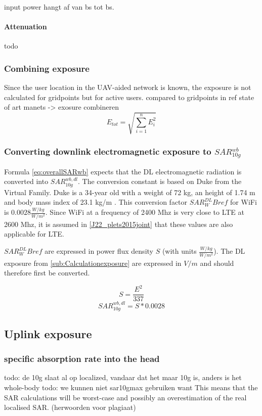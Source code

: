 input power hangt af van bs tot bs.
\paragraph{Attenuation}
todo

\subsubsection{Combining exposure}
\label{sec:combiningexposure}
Since the user location in the UAV-aided network is known, the exposure is not calculated for gridpoints but for active users. compared to gridpoints in ref state of art
manets -> exosure combineren
\begin{equation}
E_{tot} = \sqrt{\sum_{i=1}^{n} E_i^2}
\label{eq:totalexposure}
\end{equation}

\subsubsection{Converting downlink electromagnetic exposure to $SAR^{wb}_{10g}$}
\label{sub:convertDLtosarwb}
Formula \ref{eq:overallSARwb} expects that the \gls{DL} electromagnetic radiation is converted into $SAR^{wb,dl}_{10g}$.
The conversion constant is based on Duke from the Virtual Family. Duke is a 34-year old with  a weight of 72 kg, an height of 1.74 m and body
mass index of 23.1 kg/m \cite{J22_plets2015joint}.  This conversion factor $SAR^{DL}_WBref$ for WiFi is $0.0028 \frac{W/kg}{W/m^2}$. Since WiFi at a frequency of 2400 Mhz 
is very close to LTE at 2600 Mhz, it is assumed in \ref{J22_plets2015joint} that these values are also applicable for LTE.

 $SAR^{DL}_WBref$ are expressed in power flux density $S$ (with units $\frac{W/kg}{W/m^2}$). The \gls{DL} exposure from \ref{sub:Calculationexposure} are
 expressed in $V/m$ and should therefore first be converted.

 $$ S  = \frac{E^2}{337} $$
 $$ SAR^{wb,dl}_{10g} = S * 0.0028 $$




\subsection{Uplink exposure} %
\label{sub:Uplink exposure}
\subsubsection{specific absorption rate into the head}
todo: de 10g slaat al op localized, vandaar dat het maar 10g is, anders is het whole-body
todo: we kunnen niet sar10gmax gebruiken want This means that the SAR calculations will be worst-case and possibly an overestimation of the real localised SAR. (herwoorden voor plagiaat)


